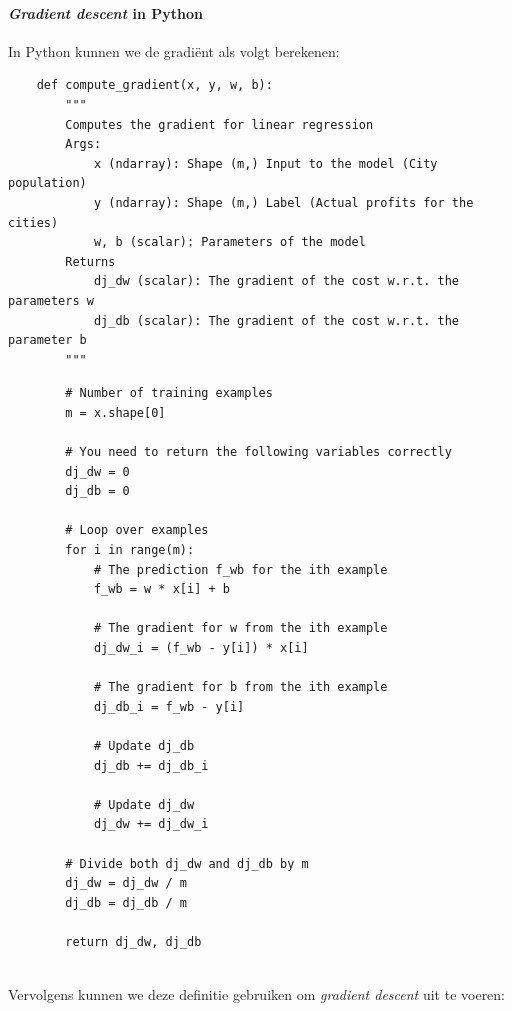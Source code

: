 \paragraph{\textit{Gradient descent} in Python}
In Python kunnen we de gradiënt als volgt berekenen:
\begin{lstlisting}
	def compute_gradient(x, y, w, b): 
	    """
	    Computes the gradient for linear regression 
	    Args:
	        x (ndarray): Shape (m,) Input to the model (City population) 
	        y (ndarray): Shape (m,) Label (Actual profits for the cities)
	        w, b (scalar): Parameters of the model  
	    Returns
	        dj_dw (scalar): The gradient of the cost w.r.t. the parameters w
	        dj_db (scalar): The gradient of the cost w.r.t. the parameter b     
	    """
\end{lstlisting}
\newpage
\begin{lstlisting}
	    # Number of training examples
	    m = x.shape[0]
	
	    # You need to return the following variables correctly
	    dj_dw = 0
	    dj_db = 0
	
	    # Loop over examples
	    for i in range(m):  
	        # The prediction f_wb for the ith example
	        f_wb = w * x[i] + b
	
	        # The gradient for w from the ith example 
	        dj_dw_i = (f_wb - y[i]) * x[i]
	
	        # The gradient for b from the ith example 
	        dj_db_i = f_wb - y[i]
	
	        # Update dj_db
	        dj_db += dj_db_i
	
	        # Update dj_dw
	        dj_dw += dj_dw_i
	
	    # Divide both dj_dw and dj_db by m
	    dj_dw = dj_dw / m
	    dj_db = dj_db / m
	
	    return dj_dw, dj_db
\end{lstlisting}
\noindent
\\
Vervolgens kunnen we deze definitie gebruiken om \textit{gradient descent} uit te voeren:

